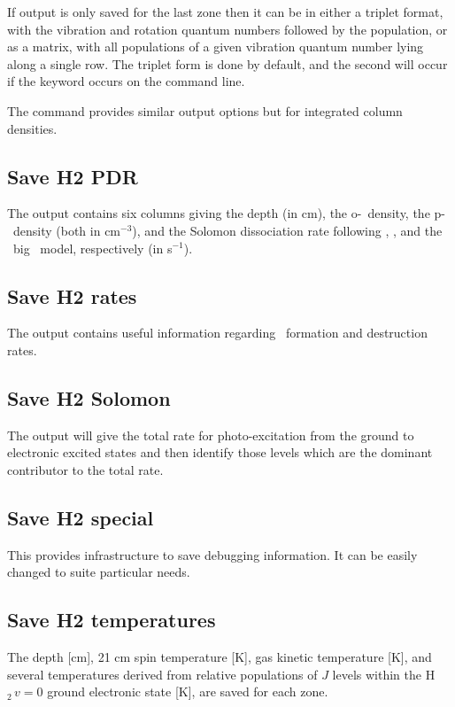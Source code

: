 If output is only saved for the last zone then it can be in either
a triplet format, with the vibration and rotation quantum numbers followed
by the population, or as a matrix, with all populations of a given vibration
quantum number lying along a single row.  The triplet form is done by
default, and the second will occur if the keyword
 occurs on the command line.

The  command provides similar output
options but for integrated column densities.

\subsection{Save H2 PDR}

The output contains six columns giving the depth (in cm), the
o-\htwo\ density, the p-\htwo\ density (both in cm$^{-3}$), and the Solomon
dissociation rate following \citet{Tielens1985a}, \citet{Bertoldi1996}, and
the \Cloudy\ big \htwo\ model, respectively (in s$^{-1}$).

\subsection{Save H2 rates}

The output contains useful information regarding \htwo\ formation and
destruction rates.

\subsection{Save H2 Solomon}

The output will give the total rate for photo-excitation from the ground
to electronic excited states and then identify those levels which are the
dominant contributor to the total rate.

\subsection{Save H2 special}

This provides infrastructure to save debugging information.  It can
be easily changed to suite particular needs.

\subsection{Save H2 temperatures}

The depth [cm], 21 cm spin temperature [K], gas kinetic temperature [K],
and several temperatures derived from relative populations of $J$ levels within
the H$_2\, v=0$ ground  electronic state [K], are saved for each zone.

